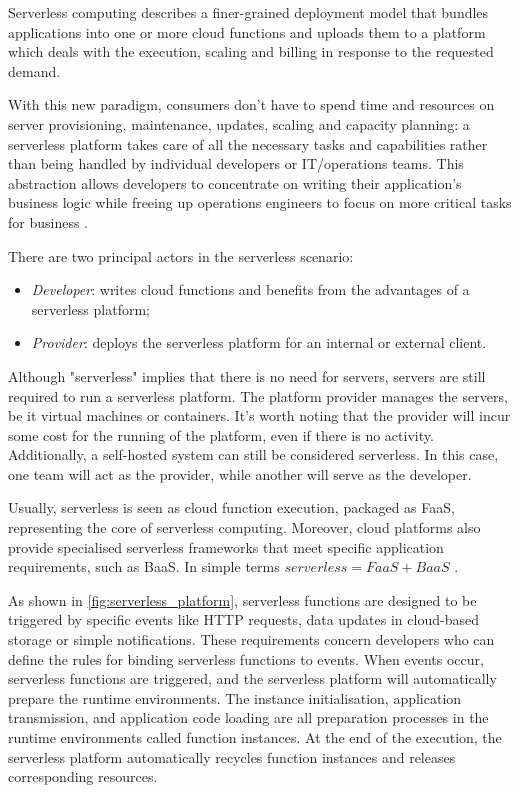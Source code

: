\documentclass[../thesis.tex]{subfiles}
\begin{document}
Serverless computing describes a finer-grained deployment model that bundles applications into one or more cloud functions and uploads them to a platform which deals with the execution, scaling and billing in response to the requested demand.

With this new paradigm, consumers don't have to spend time and resources on server provisioning, maintenance, updates, scaling and capacity planning: a serverless platform takes care of all the necessary tasks and capabilities rather than being handled by individual developers or IT/operations teams. This abstraction allows developers to concentrate on writing their application's business logic while freeing up operations engineers to focus on more critical tasks for business \cite{site:cncf_serverless}.

There are two principal actors in the serverless scenario:
\begin{itemize}
    \item \textit{Developer}: writes cloud functions and benefits from the advantages of a serverless platform;
    \item \textit{Provider}: deploys the serverless platform for an internal or external client.
\end{itemize}

Although "serverless" implies that there is no need for servers, servers are still required to run a serverless platform. The platform provider manages the servers, be it virtual machines or \gls{container}s. It's worth noting that the provider will incur some cost for the running of the platform, even if there is no activity. Additionally, a self-hosted system can still be considered serverless. In this case, one team will act as the provider, while another will serve as the developer.

Usually, serverless is seen as cloud function execution, packaged as FaaS, representing the core of serverless computing. Moreover, cloud platforms also provide specialised serverless frameworks that meet specific application requirements, such as BaaS. In simple terms $serverless = FaaS + BaaS$ \cite{article:simplified_serverless_2019}.

As shown in \autoref{fig:serverless_platform}, serverless functions are designed to be triggered by specific events like \acrshort{HTTP} requests, data updates in cloud-based storage or simple notifications. These requirements concern developers who can define the rules for binding serverless functions to events. When events occur, serverless functions are triggered, and the serverless platform will automatically prepare the runtime environments. The instance initialisation, application transmission, and application code loading are all preparation processes in the runtime environments called function instances. At the end of the execution, the serverless platform automatically recycles function instances and releases corresponding resources.
\end{document}
